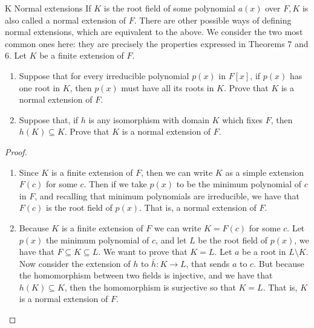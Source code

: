 \begin{exercise}{K Normal extensions}
If $K$ is the root field of some polynomial $a(x)$ over $F, K$ is also called a normal extension of $F$. There are other possible ways of defining normal extensions, which are equivalent to the above. We consider the two most common ones here: they are precisely the properties expressed in Theorems 7 and 6. Let $K$ be a finite extension of $F$.
\begin{enumerate}
    \item Suppose that for every irreducible polynomial $p(x)$ in $F[x]$, if $p(x)$ has one root in $K$, then $p(x)$ must have all its roots in $K$. Prove that $K$ is a normal extension of $F$.
    \item Suppose that, if $h$ is any isomorphism with domain $K$ which fixes $F$, then $h(K)\subseteq K$. Prove that $K$ is a normal extension of $F$.
\end{enumerate}
\end{exercise}
\begin{proof}
 \begin{enumerate}
     \item Since $K$ is a finite extension of $F$, then we can write $K$ as a simple extension $F(c)$ for some $c$. Then if we take $p(x)$ to be the minimum polynomial of $c$ in $F$, and recalling that minimum polynomials are irreducible, we have that $F(c)$ is the root field of $p(x)$. That is, a normal extension of $F$.
     \item Because $K$ is a finite extension of $F$ we can write $K=F(c)$ for some $c$. Let $p(x)$ the minimum polynomial of $c$, and let $L$ be the root field of $p(x)$, we have that $F\subseteq K\subseteq L$. We want to prove that $K=L$. Let $a$ be a root in $L\setminus K$. Now consider the extension of $h$ to $\bar{h}:K\rightarrow L$, that sends $a$ to $c$. But because the homomorphism between two fields is injective, and we have that $h(K)\subseteq K$, then the homomorphism is surjective so that $K=L$. That is, $K$ is a normal extension of $F$.
 \end{enumerate}
\end{proof}